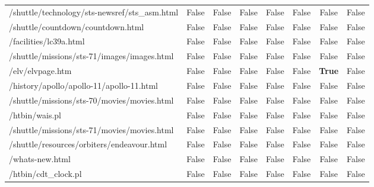 \documentclass{classrep}
\begin{document}
\begin{table}[H]
{\begin{tabular}{@{}lccccccc@{}}
    /shuttle/technology/sts-newsref/sts\_asm.html & False & False & False & False & False & False & False \\
    /shuttle/countdown/countdown.html & False & False & False & False & False & False & False \\
    /facilities/lc39a.html & False & False & False & False & False & False & False \\
    /shuttle/missions/sts-71/images/images.html & False & False & False & False & False & False & False \\
    /elv/elvpage.htm & False & False & False & False & False & \textbf{True} & False \\
    /history/apollo/apollo-11/apollo-11.html & False & False & False & False & False & False & False \\
    /shuttle/missions/sts-70/movies/movies.html & False & False & False & False & False & False & False \\
    /htbin/wais.pl & False & False & False & False & False & False & False \\
    /shuttle/missions/sts-71/movies/movies.html & False & False & False & False & False & False & False \\
    /shuttle/resources/orbiters/endeavour.html & False & False & False & False & False & False & False \\
    /whats-new.html & False & False & False & False & False & False & False \\
    /htbin/cdt\_clock.pl & False & False & False & False & False & False & False \\ \bottomrule
    \end{tabular}%
    }
    \end{table}

    \begin{table}[H]
    \centering
    \caption{Przypisanie obserwacji dla 6 klastrów z flagami stron podczas analizy użytkowników}
    \label{tab:usr_6clusters_sum_pages}
    \end{table}
\end{document}
